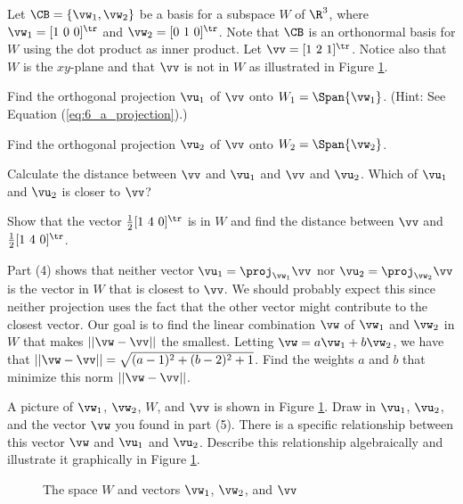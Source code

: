 \begin{pa} \label{pa:6_c_2} Let $\CB = \{\vw_1, \vw_2\}$ be a basis for a subspace $W$ of $\R^3$,  where $\vw_1 = [1 \ 0 \ 0]^{\tr}$ and $\vw_2 = [0 \ 1 \ 0]^{\tr}$. Note that $\CB$ is an orthonormal basis for $W$ using the dot product as inner product. Let $\vv = [1 \ 2 \ 1]^{\tr}$. Notice also that $W$ is the $xy$-plane and that $\vv$ is not in $W$ as illustrated in Figure \ref{F:6_d_o_proj}.
	\be
	\item Find the orthogonal projection $\vu_1$ of $\vv$ onto $W_1 = \Span\{\vw_1\}$. (Hint: See Equation (\ref{eq:6_a_projection}).) 

	
	\item Find the orthogonal projection $\vu_2$ of $\vv$ onto $W_2 = \Span\{\vw_2\}$.

	\item Calculate the distance between $\vv$ and $\vu_1$ and $\vv$ and $\vu_2$. Which of $\vu_1$ and $\vu_2$ is closer to $\vv$?
			
	\item Show that the vector $\frac{1}{2} [1 \ 4 \ 0]^{\tr}$ is in $W$ and find the distance between $\vv$ and $\frac{1}{2} [1 \ 4 \ 0]^{\tr}$.

\item Part (4) shows that neither vector $\vu_1 = \proj_{\vw_1} \vv$ nor $\vu_2 = \proj_{\vw_2} \vv$ is the vector in $W$ that is closest to $\vv$. We should probably expect this since neither projection uses the fact that the other vector might contribute to the closest vector. Our goal is to find the linear combination $\vw$ of $\vw_1$ and $\vw_2$ in $W$ that makes $|| \vw - \vv ||$ the smallest. Letting $\vw = a \vw_1 + b\vw_2$, we have that $||\vw - \vv|| = \sqrt{(a-1)^2 + (b-2)^2 + 1}$. Find the weights $a$ and $b$ that minimize this norm $||\vw - \vv||$. 
	
\item A picture of $\vw_1$, $\vw_2$, $W$, and $\vv$ is shown in Figure \ref{F:6_d_o_proj}. Draw in $\vu_1$, $\vu_2$, and the vector $\vw$ you found in part (5). There is a specific relationship between this vector $\vw$ and $\vu_1$ and $\vu_2$. Describe this relationship algebraically and illustrate it graphically in Figure \ref{F:6_d_o_proj}.  
\begin{figure}[h]
\begin{center}
\end{center}
\caption{The space $W$ and vectors $\vw_1$, $\vw_2$, and $\vv$}
\label{F:6_d_o_proj}
\end{figure}


	\ee
\end{pa}


